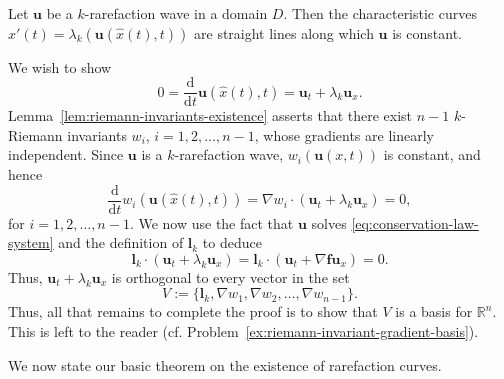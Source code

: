 \begin{Theorem}
\label{thm:system-rarefaction-straight-characteristics}
Let $\bm{u}$ be a $k$-rarefaction wave in a domain $D$. Then the characteristic curves $\hat x'(t)=\lambda_k(\bm{u}(\hat x(t),t))$ are straight lines along which $\bm{u}$ is constant.
\end{Theorem}

\begin{Proof}
We wish to show
\begin{equation}\label{eq:rarefaction-constant-along-characteristics}
0=\dfrac{\mathrm{d}}{\mathrm{d}t}\bm{u}(\hat x(t),t)=\bm{u}_t+\lambda_k\bm{u}_x.
\end{equation}
Lemma~\ref{lem:riemann-invariants-existence} asserts that there exist $n-1$ $k$-Riemann invariants $w_i$, $i=1,2,\ldots,n-1$, whose gradients are linearly independent. Since $\bm{u}$ is a $k$-rarefaction wave, $w_i(\bm{u}(x,t))$ is constant, and hence
\begin{equation}\label{eq:rarefaction-invariant-directional-derivatives}
\dfrac{\mathrm{d}}{\mathrm{d}t}w_i(\bm{u}(\hat x(t),t))=\nabla w_i\cdot(\bm{u}_t+\lambda_k\bm{u}_x)=0,
\end{equation}
for $i=1,2,\ldots,n-1$. We now use the fact that $\bm{u}$ solves \eqref{eq:conservation-law-system} and the definition of $\bm{l}_k$ to deduce
\begin{equation}\label{eq:rarefaction-left-eigenvector-identity}
\bm{l}_k\cdot(\bm{u}_t+\lambda_k\bm{u}_x)=\bm{l}_k\cdot(\bm{u}_t+\nabla\bm{f}\bm{u}_x)=0.
\end{equation}
Thus, $\bm{u}_t+\lambda_k\bm{u}_x$ is orthogonal to every vector in the set
\begin{equation}\label{eq:rarefaction-invariant-gradient-basis}
V:=\{\bm{l}_k,\nabla w_1,\nabla w_2,\ldots,\nabla w_{n-1}\}.
\end{equation}
Thus, all that remains to complete the proof is to show that $V$ is a basis for $\mathbb{R}^n$. This is left to the reader (cf. Problem~\ref{ex:riemann-invariant-gradient-basis}).
\end{Proof}

We now state our basic theorem on the existence of rarefaction curves.

